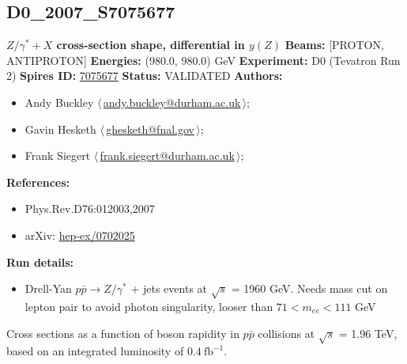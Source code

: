 \clearpage


\clearpage

\subsection[D0\_2007\_S7075677]{D0\_2007\_S7075677\,\cite{Abazov:2007jy}}
\textbf{$Z/\gamma^* + X$ cross-section shape, differential in $y(Z)$}\newline
\textbf{Beams:} [PROTON, ANTIPROTON] \newline
\textbf{Energies:} (980.0, 980.0) GeV \newline
\textbf{Experiment:} D0 (Tevatron Run 2) \newline
\textbf{Spires ID:} \href{http://www.slac.stanford.edu/spires/find/hep/www?rawcmd=key+7075677}{7075677}\newline
\textbf{Status:} VALIDATED\newline
\textbf{Authors:}
\begin{itemize}
  \item Andy Buckley $\langle\,$\href{mailto:andy.buckley@durham.ac.uk}{andy.buckley@durham.ac.uk}$\,\rangle$;
  \item Gavin Hesketh $\langle\,$\href{mailto:ghesketh@fnal.gov}{ghesketh@fnal.gov}$\,\rangle$;
  \item Frank Siegert $\langle\,$\href{mailto:frank.siegert@durham.ac.uk}{frank.siegert@durham.ac.uk}$\,\rangle$;
\end{itemize}
\textbf{References:}
\begin{itemize}
  \item Phys.Rev.D76:012003,2007
  \item arXiv: \href{http://arxiv.org/abs/hep-ex/0702025}{hep-ex/0702025}
\end{itemize}
\textbf{Run details:}
\begin{itemize}

  \item Drell-Yan $p \bar{p} \to Z/\gamma^*$ + jets events at $\sqrt{s}$ = 1960 GeV. Needs mass cut on lepton pair to avoid photon singularity, looser than  $71 < m_{ee} < 111$ GeV\end{itemize}

\noindent Cross sections as a function of boson rapidity in $p \bar{p}$ collisions at $\sqrt{s}$ = 1.96 TeV, based on an integrated luminosity of $0.4~\text{fb}^{-1}$.

\clearpage


